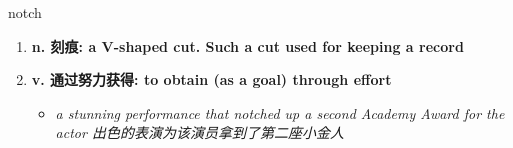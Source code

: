 
\begin{frame}
{\huge notch}
\begin{center}
\begin{enumerate}\Large
  \item \textbf{n. 刻痕: a V-shaped cut. Such a cut used for keeping a record}
  \item \textbf{v. 通过努力获得: to obtain (as a goal) through effort}
  \begin{itemize}
    \item \em{\Large{a stunning performance that notched up a second Academy Award for the actor 出色的表演为该演员拿到了第二座小金人}}
  \end{itemize}
\end{enumerate}
\end{center}
\end{frame}
